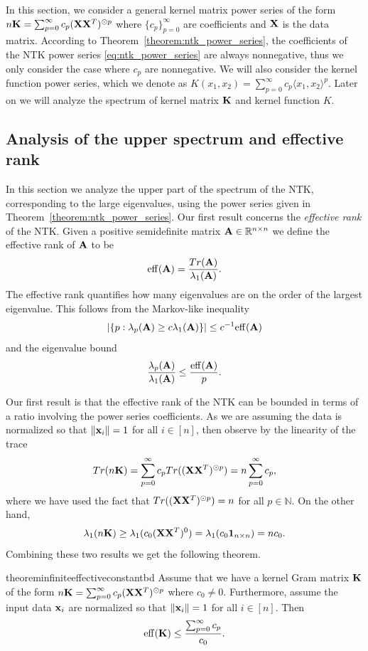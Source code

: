 In this section, we consider a general kernel matrix power series of the form $n \mathbf{K} = \sum_{p = 0}^\infty c_p (\mathbf{X} \mathbf{X}^T)^{\odot p}$ where $\{c_p\}_{p = 0}^\infty$ are coefficients and $\mathbf{X}$ is the data matrix. According to Theorem~\ref{theorem:ntk_power_series}, the coefficients of the NTK power series \eqref{eq:ntk_power_series} are always nonnegative, thus we only consider the case where $c_p$ are nonnegative. We will also consider the kernel function power series, which we denote as $K(x_1,x_2) = \sum_{p = 0}^{\infty} c_p \langle x_1,x_2\rangle^p$. Later on we will analyze the spectrum of kernel matrix $\mathbf{K}$ and kernel function $K$.
\subsection{Analysis of the upper spectrum and effective rank} \label{subsec:partial_trace}
In this section we analyze the upper part of the spectrum of the NTK, corresponding to the large eigenvalues, using the power series given in Theorem~\ref{theorem:ntk_power_series}.  Our first result concerns the \textit{effective rank} \citep{DBLP:journals/simods/HuangHV22} of the NTK.  
Given a positive semidefinite matrix $\mathbf{A} \in \mathbb{R}^{n \times n}$ we define the effective rank of $\mathbf{A}$ to be
\[ 
\mathrm{eff}(\mathbf{A}) = \frac{Tr(\mathbf{A})}{\lambda_1(\mathbf{A})}. 
\] 
The effective rank quantifies how many eigenvalues are on the order of the largest eigenvalue. This follows from the Markov-like inequality 
\begin{equation}\label{eq:eigmarkov}
\left\lvert\{ p : \lambda_p(\mathbf{A}) \geq c \lambda_1(\mathbf{A})\}\right\rvert \leq c^{-1} \mathrm{eff}(\mathbf{A})
\end{equation}
and the eigenvalue bound
\[ \frac{\lambda_p(\mathbf{A})}{\lambda_1(\mathbf{A})} \leq \frac{\mathrm{eff}(\mathbf{A})}{p}. \]
\par
Our first result is that the effective rank of the NTK can be bounded in terms of a ratio involving the power series coefficients.  As we are assuming the data is normalized so that $\left\lVert\mathbf{x}_i\right\rVert = 1$ for all $i \in [n]$, then observe by the linearity of the trace 
\[ 
Tr(n \mathbf{K}) = \sum_{p = 0}^\infty c_p Tr((\mathbf{X} \mathbf{X}^T)^{\odot p}) = n \sum_{p = 0}^\infty c_p, 
\]
where we have used the fact that $Tr((\mathbf{X} \mathbf{X}^T)^{\odot p}) = n$ for all $p \in \mathbb{N}$.  On the other hand, 
\[ 
\lambda_1(n \mathbf{K}) \geq \lambda_1(c_0 (\mathbf{X} \mathbf{X}^T)^0) = \lambda_1(c_0 \mathbf{1}_{n \times n} ) = n c_0. 
\]
Combining these two results we get the following theorem. 
\begin{restatable}{theorem}{infiniteeffectiveconstantbd}\label{thm:infinite_effective_constant_bd}
Assume that we have a kernel Gram matrix $\mathbf{K}$ of the form $n \mathbf{K} = \sum_{p = 0}^\infty c_p (\mathbf{X} \mathbf{X}^T)^{\odot p}$ where $c_0 \neq 0$.  Furthermore, assume the input data $\mathbf{x}_i$ are normalized so that $\left\lVert\mathbf{x}_i\right\rVert = 1$ for all $i \in [n]$.  Then 
\[ 
\mathrm{eff}(\mathbf{K}) \leq \frac{\sum_{p = 0}^\infty c_p}{c_0}. 
\]
\end{restatable}
